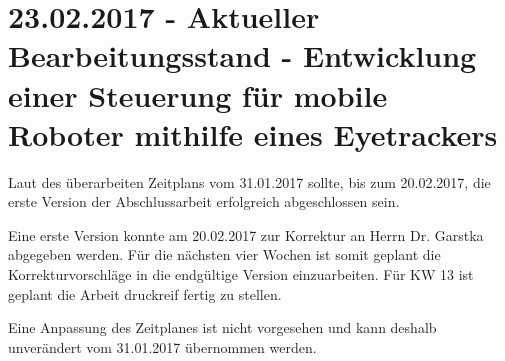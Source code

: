 \documentclass[11pt,a4paper,onecolumn,twoside,ngerman]{book}
\begin{document}
\section*{23.02.2017 - Aktueller Bearbeitungsstand - Entwicklung einer Steuerung für mobile Roboter mithilfe eines Eyetrackers}

Laut des überarbeiten Zeitplans vom 31.01.2017 sollte, bis zum 20.02.2017, die erste Version der Abschlussarbeit erfolgreich abgeschlossen sein. 

Eine erste Version konnte am 20.02.2017 zur Korrektur an Herrn Dr. Garstka abgegeben werden. Für die nächsten vier Wochen ist somit geplant die Korrekturvorschläge in die endgültige Version einzuarbeiten. Für KW 13 ist geplant die Arbeit druckreif fertig zu stellen. 

Eine Anpassung des Zeitplanes ist nicht vorgesehen und kann deshalb unverändert vom 31.01.2017 übernommen werden.
\end{document}
